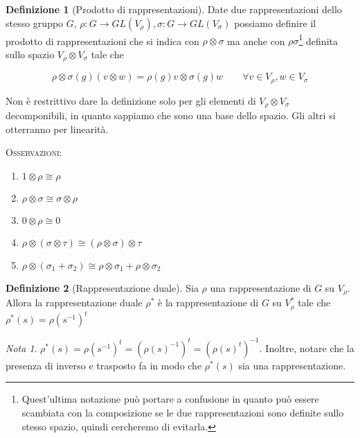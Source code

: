 \documentclass[11pt]{article}
\theoremstyle{plain}
\theoremstyle{definition}
\newtheorem{defn}{Definizione}[section]
\theoremstyle{remark}
\newtheorem*{note}{Nota}
\begin{document}
\begin{defn}[Prodotto di rappresentazioni]
  Date due rappresentazioni dello stesso gruppo $G$, $\rho: G \to GL(V_\rho), \sigma: G \to GL(V_\sigma)$ possiamo definire il prodotto di rappresentazioni che si indica con $\rho \otimes \sigma$  ma anche con $\rho\sigma$\footnote{Quest'ultima notazione può portare a confusione in quanto può essere scambiata con la composizione se le due rappresentazioni sono definite sullo stesso spazio, quindi cercheremo di evitarla.} definita sullo spazio $V_\rho \otimes V_\sigma$ tale che

  \[ \rho \otimes \sigma(g) (v \otimes w) = \rho(g) v \otimes \sigma(g) w \qquad \forall v \in V_\rho, w \in V_\sigma\]

  Non è restrittivo dare la definizione solo per gli elementi di $V_\rho \otimes V_\sigma$ decomponibili, in quanto sappiamo che sono una base dello spazio. Gli altri si otterranno per linearità.
  
\label{defn:prodotto di rappresentazioni}
\end{defn}


\textsc{Osservazioni:}


\begin{enumerate}
\item $1\otimes \rho \cong \rho$
\item $\rho \otimes \sigma \cong \sigma \otimes \rho$
\item $0 \otimes \rho \cong 0$
\item $\rho \otimes (\sigma \otimes \tau) \cong (\rho \otimes \sigma)\otimes \tau$
\item $\rho \otimes (\sigma_1 + \sigma_2) \cong \rho \otimes \sigma_1 + \rho \otimes \sigma_2$

\end{enumerate}





\begin{defn}[Rappresentazione duale]
Sia $\rho$ una rappresentazione di $G$ su $V_\rho$. Allora la rappresentazione duale $\rho^*$ è la rappresentazione di $G$ su $V_\rho ^*$ tale che $\rho^*(s)=\rho(s^{-1})^t$
\label{defn:rappresentazione duale}
\end{defn}

\begin{note}
$\rho^*(s)=\rho(s^{-1})^t=\left(\rho(s)^{-1}\right)^t=\left(\rho(s)^t\right)^{-1}$. Inoltre, notare che la presenza di inverso e trasposto fa in modo che $\rho^*(s)$ sia una rappresentazione.
\end{note}
\end{document}
